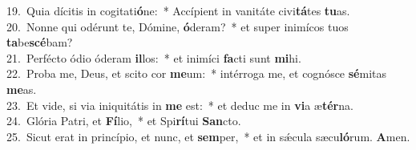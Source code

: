 {19.~}Quia dícitis in cogitati\textbf{ó}ne:~* Accípient in vanitáte civi\textbf{tá}tes \textbf{tu}as.\\
{20.~}Nonne qui odérunt te, Dómine, \textbf{ó}deram?~* et super inimícos tuos \textbf{ta}be\textbf{scé}bam?\\
{21.~}Perfécto ódio óderam \textbf{il}los:~* et inimíci \textbf{fa}cti sunt \textbf{mi}hi.\\
{22.~}Proba me, Deus, et scito cor \textbf{me}um:~* intérroga me, et cognósce \textbf{sé}mitas \textbf{me}as.\\
{23.~}Et vide, si via iniquitátis in \textbf{me} est:~* et deduc me in \textbf{vi}a æ\textbf{tér}na.\\
{24.~}Glória Patri, et \textbf{Fí}lio,~* et Spi\textbf{rí}tui \textbf{San}cto.\\
{25.~}Sicut erat in princípio, et nunc, et \textbf{sem}per,~* et in sǽcula sæcu\textbf{ló}rum. \textbf{A}men.\\
